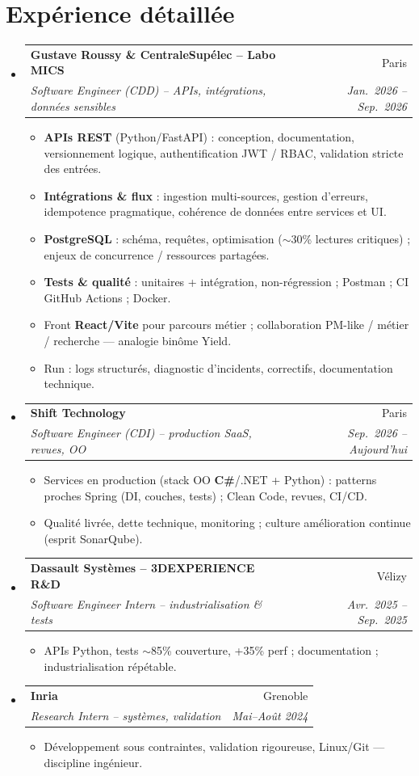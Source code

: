 \documentclass[a4paper,10.5pt]{article}
\makeatletter
\newcommand{\resumeItem}[1]{\item\small{#1}}
\newcommand{\resumeSubheading}[4]{\vspace{2.5pt}\item\begin{tabular*}{0.97\textwidth}[t]{l@{\extracolsep{\fill}}r}\textbf{#1}&{#2}\\\textit{\small #3}&\textit{\small #4}\\\end{tabular*}\vspace{1pt}}
\newcommand{\resumeSubHeadingListStart}{\begin{itemize}[leftmargin=0.08in,label={}]}
\newcommand{\resumeSubHeadingListEnd}{\end{itemize}}
\makeatother
\begin{document}
\section{Exp\'erience d\'etaill\'ee}
\resumeSubHeadingListStart
  \resumeSubheading
    {Gustave Roussy \& CentraleSup\'elec -- Labo MICS}{Paris}
    {Software Engineer (CDD) -- APIs, int\'egrations, donn\'ees sensibles}{Jan.~2026 -- Sep.~2026}
    \begin{itemize}
      \resumeItem{\textbf{APIs REST} (Python/FastAPI) : conception, documentation, versionnement logique, authentification JWT / RBAC, validation stricte des entr\'ees.}
      \resumeItem{\textbf{Int\'egrations \& flux} : ingestion multi-sources, gestion d'erreurs, idempotence pragmatique, coh\'erence de donn\'ees entre services et UI.}
      \resumeItem{\textbf{PostgreSQL} : sch\'ema, requ\^etes, optimisation ($\sim$30\% lectures critiques) ; enjeux de concurrence / ressources partag\'ees.}
      \resumeItem{\textbf{Tests \& qualit\'e} : unitaires + int\'egration, non-r\'egression ; Postman ; CI GitHub Actions ; Docker.}
      \resumeItem{Front \textbf{React/Vite} pour parcours m\'etier ; collaboration PM-like / m\'etier / recherche --- analogie bin\^ome Yield.}
      \resumeItem{Run : logs structur\'es, diagnostic d'incidents, correctifs, documentation technique.}
    \end{itemize}
  \resumeSubheading
    {Shift Technology}{Paris}
    {Software Engineer (CDI) -- production SaaS, revues, OO}{Sep.~2026 -- Aujourd'hui}
    \begin{itemize}
      \resumeItem{Services en production (stack OO \textbf{C\#}/.NET + Python) : patterns proches Spring (DI, couches, tests) ; Clean Code, revues, CI/CD.}
      \resumeItem{Qualit\'e livr\'ee, dette technique, monitoring ; culture am\'elioration continue (esprit SonarQube).}
    \end{itemize}
  \resumeSubheading
    {Dassault Syst\`emes -- 3DEXPERIENCE R\&D}{V\'elizy}
    {Software Engineer Intern -- industrialisation \& tests}{Avr.~2025 -- Sep.~2025}
    \begin{itemize}
      \resumeItem{APIs Python, tests $\sim$85\% couverture, +35\% perf ; documentation ; industrialisation r\'ep\'etable.}
    \end{itemize}
  \resumeSubheading
    {Inria}{Grenoble}
    {Research Intern -- syst\`emes, validation}{Mai--Ao\^ut 2024}
    \begin{itemize}
      \resumeItem{D\'eveloppement sous contraintes, validation rigoureuse, Linux/Git --- discipline ing\'enieur.}
    \end{itemize}
\resumeSubHeadingListEnd
\end{document}
